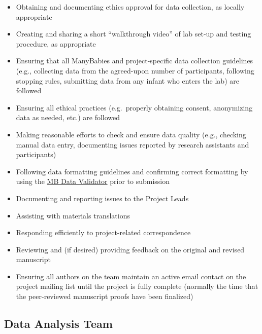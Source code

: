 \documentclass[
  letterpaper,
  DIV=11,
  numbers=noendperiod,
  oneside]{scrreprt}
\providecommand{\tightlist}{%
  \setlength{\itemsep}{0pt}\setlength{\parskip}{0pt}}
\begin{document}
\begin{itemize}
\tightlist
\item
  Obtaining and documenting ethics approval for data collection, as
  locally appropriate
\item
  Creating and sharing a short ``walkthrough video'' of lab set-up and
  testing procedure, as appropriate
\item
  Ensuring that all ManyBabies and project-specific data collection
  guidelines (e.g., collecting data from the agreed-upon number of
  participants, following stopping rules, submitting data from any
  infant who enters the lab) are followed
\item
  Ensuring all ethical practices (e.g.~properly obtaining consent,
  anonymizing data as needed, etc.) are followed
\item
  Making reasonable efforts to check and ensure data quality (e.g.,
  checking manual data entry, documenting issues reported by research
  assistants and participants)
\item
  Following data formatting guidelines and confirming correct formatting
  by using the \href{manybabies.org/validator}{MB Data Validator} prior
  to submission
\item
  Documenting and reporting issues to the Project Leads
\item
  Assisting with materials translations
\item
  Responding efficiently to project-related correspondence
\item
  Reviewing and (if desired) providing feedback on the original and
  revised manuscript
\item
  Ensuring all authors on the team maintain an active email contact on
  the project mailing list until the project is fully complete (normally
  the time that the peer-reviewed manuscript proofs have been finalized)
\end{itemize}

\subsection{Data Analysis Team}\label{data-analysis-team}
\end{document}
